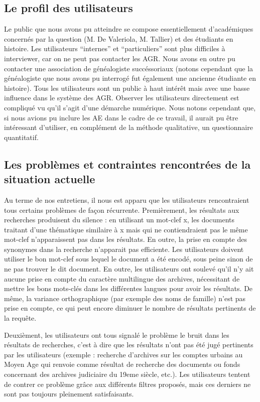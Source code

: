 \documentclass[a4paper,12pt]{article}
\begin{document}
\subsection{Le profil des utilisateurs}
Le public que nous avons pu atteindre se compose essentiellement d'académiques concernés par la question (M. De Valeriola, M. Tallier) et des étudiants en histoire. Les utilisateurs “internes” et “particuliers” sont plus difficiles à interviewer, car on ne peut pas contacter les AGR. Nous avons en outre pu contacter une association de généalogiste succéssoriaux (notons cependant que la généalogiste que nous avons pu interrogé fut également une ancienne étudiante en histoire).
Tous les utilisateurs sont un public à haut intérêt mais avec une basse influence dans le système des AGR. Observer les utilisateurs directement est compliqué vu qu’il s’agit d’une démarche numérique. 
Nous notons cependant que, si nous avions pu inclure les AE dans le cadre de ce travail, il aurait pu être intéressant d'utiliser, en complément de la méthode qualitative, un questionnaire quantitatif.

\subsection{Les problèmes et contraintes rencontrées de la situation actuelle}
Au terme de nos entretiens, il nous est apparu que les utilisateurs rencontraient tous certains problèmes de façon récurrente. 
Premièrement, les résultats aux recherches produisent du silence : en utilisant un mot-clef x, les documents traitant d’une thématique similaire à x mais qui ne contiendraient pas le même mot-clef n’apparaissent pas dans les résultats. En outre, la prise en compte des synonymes dans la recherche n'apparait pas efficiente. Les utilisateurs doivent utiliser le bon mot-clef sous lequel le document a été encodé, sous peine sinon de ne pas trouver le dit document. En outre, les utilisateurs ont soulevé qu'il n’y ait aucune prise en compte du caractère multilingue des archives, nécessitant de mettre les bons mots-clés dans les différentes langues pour avoir les résultats. De même, la variance orthographique (par exemple des noms de famille) n’est pas prise en compte, ce qui peut encore diminuer le nombre de résultats pertinents de la requête. 

Deuxièment, les utilisateurs ont tous signalé le problème le bruit dans les résultats de recherches, c'est à dire que les résultats n'ont pas été jugé pertinents par les utilisateurs (exemple : recherche d'archives sur les comptes urbains au Moyen Age qui renvoie comme résultat de recherche des documents ou fonds concernant des archives judiciaire du 19eme siècle, etc.). Les utilisateurs tentent de contrer ce problème grâce aux différents filtres proposés, mais ces derniers ne sont pas toujours pleinement satisfaisants. 
\end{document}
